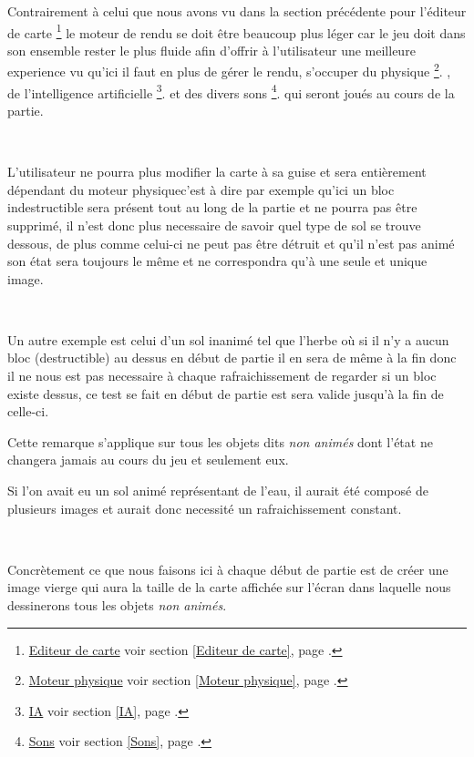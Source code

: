 			Contrairement à celui que nous avons vu dans la section précédente pour
			l'éditeur de carte
			\footnote{
				\hyperlink{Editeur de carte}{Editeur de carte}
				\og voir section \ref{Editeur de carte}, page \pageref{Editeur de carte}.\fg
			}
			le moteur de rendu se doit être beaucoup plus léger car le jeu doit dans son
			ensemble rester le plus fluide afin d'offrir à l'utilisateur une meilleure
			experience vu qu'ici il faut en plus de gérer le rendu, s'occuper du
			physique
			\footnote{
				\hyperlink{Moteur physique}{Moteur physique}
				\og voir section \ref{Moteur physique}, page \pageref{Moteur physique}.\fg
			}.
			, de l'intelligence artificielle
			\footnote{
				\hyperlink{IA}{IA}
				\og voir section \ref{IA}, page \pageref{IA}.\fg
			}.
			et des divers sons
			\footnote{
				\hyperlink{Sons}{Sons}
				\og voir section \ref{Sons}, page \pageref{Sons}.\fg
			}.
			qui seront joués au cours de la partie.		
			
			$\,$	
			
			L'utilisateur ne pourra plus modifier la carte à sa guise et sera
			entièrement dépendant du moteur physique\footnotemark[3] c'est à dire par
			exemple qu'ici un bloc indestructible sera présent tout au long de la
			partie et ne pourra pas être supprimé, il n'est donc plus necessaire de
			savoir quel type de sol se trouve dessous, de plus comme celui-ci ne peut pas
			être détruit et qu'il n'est pas animé son état sera toujours le même et ne
			correspondra qu'à une seule et unique image.
			
			$\,$			
			
			Un autre exemple est celui d'un sol inanimé tel que l'herbe où si il n'y a
			aucun bloc (destructible) au dessus en début de partie il en sera de même à
			la fin donc il ne nous est pas necessaire à chaque rafraichissement de
			regarder si un bloc existe dessus, ce test se fait en début de partie est
			sera valide jusqu'à la fin de celle-ci.
			
			
			Cette remarque s'applique sur tous les objets dits \emph{non animés} dont
			l'état ne changera jamais au cours du jeu et seulement eux.
			
			
			Si l'on avait eu un sol animé représentant de l'eau, il aurait été composé de
			plusieurs images et aurait donc necessité un rafraichissement constant.

			$\,$
			
			Concrètement ce que nous faisons ici à chaque début de partie est de créer
			une image vierge qui aura la taille de la carte affichée sur l'écran dans
			laquelle nous dessinerons tous les objets \emph{non animés}.
			
